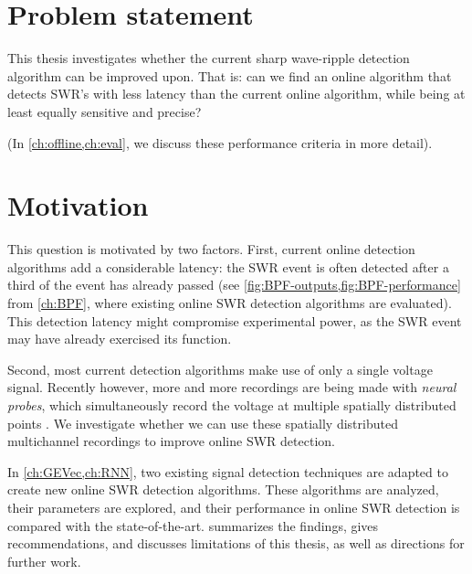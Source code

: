 \section{Problem statement}
\label{sec:problem}

This thesis investigates whether the current sharp wave-ripple detection algorithm can be improved upon. That is: can we find an online algorithm that detects SWR's with less latency than the current online algorithm, while being at least equally sensitive and precise?

(In \cref{ch:offline,ch:eval}, we discuss these performance criteria in more detail).



\section{Motivation}
\label{sec:motivation}

This question is motivated by two factors. First, current online detection algorithms add a considerable latency: the SWR event is often detected after a third of the event has already passed (see \cref{fig:BPF-outputs,fig:BPF-performance} from \cref{ch:BPF}, where existing online SWR detection algorithms are evaluated). This detection latency might compromise experimental power, as the SWR event may have already exercised its function.

Second, most current detection algorithms make use of only a single voltage signal. Recently however, more and more recordings are being made with \emph{neural probes}, which simultaneously record the voltage at multiple spatially distributed points \cite{Michon2016,Jun2017}. We investigate whether we can use these spatially distributed multichannel recordings to improve online SWR detection.

In \cref{ch:GEVec,ch:RNN}, two existing signal detection techniques are adapted to create new online SWR detection algorithms. These algorithms are analyzed, their parameters are explored, and their performance in online SWR detection is compared with the state-of-the-art.  summarizes the findings, gives recommendations, and discusses limitations of this thesis, as well as directions for further work.
